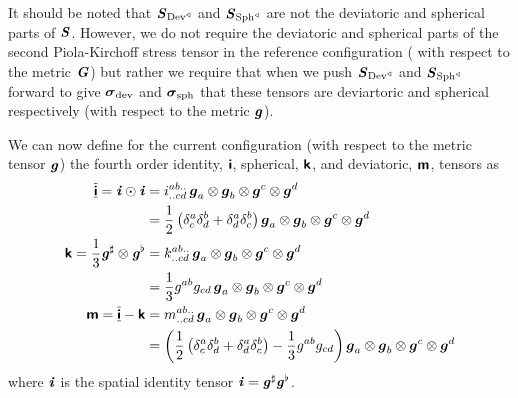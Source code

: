 It should be noted that $\boldsymbol{\mathit{S}}_{ \operatorname{Dev}^{\triangleleft} }$ and
$\boldsymbol{\mathit{S}}_{ \operatorname{Sph}^{\triangleleft} }$ are not the deviatoric and spherical parts
of $\boldsymbol{\mathit{S}}$. However, we do not require the deviatoric and spherical parts
of the second Piola-Kirchoff stress tensor in the reference configuration (\ie
with respect to the metric $\boldsymbol{\mathit{G}}$) but rather we require that when we
push $\boldsymbol{\mathit{S}}_{ \operatorname{Dev}^{\triangleleft} }$ and
$\boldsymbol{\mathit{S}}_{ \operatorname{Sph}^{\triangleleft} }$ forward to give $\boldsymbol{\mathit{\sigma}}_{\operatorname{dev}}$
and $\boldsymbol{\mathit{\sigma}}_{\operatorname{sph}}$ that these tensors are deviartoric and
spherical respectively (\ie with respect to the metric $\boldsymbol{\mathit{g}}$).

We can now define for the current configuration (\ie with respect to the
metric tensor $\boldsymbol{\mathit{g}}$) the fourth order identity,
$  \boldsymbol{\mathsf{ i }}  $, spherical, $  \boldsymbol{\mathsf{ k }}  $, and deviatoric,
$  \boldsymbol{\mathsf{ m }}  $, tensors as
\begin{align}
    \overline{\underline{\boldsymbol{\mathsf{ i }}}}  =   \boldsymbol{\mathit{ i }}   \odot \boldsymbol{\mathit{  \boldsymbol{\mathit{ i }}  }} &=
   i ^{ab..}_{..cd}\, \boldsymbol{g}_{a} \otimes \boldsymbol{g}_{b} \otimes \boldsymbol{g}^{c} \otimes \boldsymbol{g}^{d} \\ \nonumber
  &=
  \dfrac{1}{2}\left(  \delta^{a}_{c}  \delta^{b}_{d} + \delta^{a}_{d}  \delta^{b}_{c}  \right) \boldsymbol{g}_{a} \otimes \boldsymbol{g}_{b} \otimes \boldsymbol{g}^{c} \otimes \boldsymbol{g}^{d} 
  \\
    \boldsymbol{\mathsf{ k }}  =\dfrac{1}{3}  \boldsymbol{\mathit{g}}^{\sharp}  \otimes \boldsymbol{\mathit{g}}^{\flat} &=
   k ^{ab..}_{..cd}\, \boldsymbol{g}_{a} \otimes \boldsymbol{g}_{b} \otimes \boldsymbol{g}^{c} \otimes \boldsymbol{g}^{d} \\ \nonumber
  &=
  \dfrac{1}{3}g^{ab}g_{cd}\, \boldsymbol{g}_{a} \otimes \boldsymbol{g}_{b} \otimes \boldsymbol{g}^{c} \otimes \boldsymbol{g}^{d} \\
    \boldsymbol{\mathsf{ m }}  =  \overline{\underline{\boldsymbol{\mathsf{ i }}}}  -  \boldsymbol{\mathsf{ k }}  &=
   m ^{ab..}_{..cd}\, \boldsymbol{g}_{a} \otimes \boldsymbol{g}_{b} \otimes \boldsymbol{g}^{c} \otimes \boldsymbol{g}^{d} \\ \nonumber
  &=
  \left( \dfrac{1}{2}\left(  \delta^{a}_{c}  \delta^{b}_{d} + \delta^{a}_{d}  \delta^{b}_{c}  \right)-\dfrac{1}{3}g^{ab}g_{cd} \right) \boldsymbol{g}_{a} \otimes \boldsymbol{g}_{b} \otimes \boldsymbol{g}^{c} \otimes \boldsymbol{g}^{d} 
\end{align}
where $  \boldsymbol{\mathit{ i }}  $ is the spatial identity tensor \ie
$  \boldsymbol{\mathit{ i }}  = \boldsymbol{\mathit{g}}^{\sharp} \boldsymbol{\mathit{g}}^{\flat}$.

